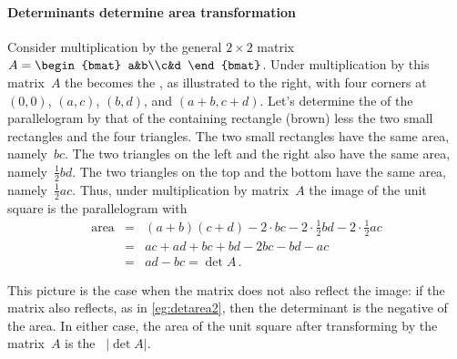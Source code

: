 \paragraph{Determinants determine area transformation}
Consider multiplication by the general \(2\times2\) matrix \(A=\begin{bmat} a&b\\c&d \end{bmat}\).
Under multiplication by this matrix~\(A\) the  becomes the , as illustrated to the right, with four corners at \((0,0)\), \((a,c)\), \((b,d)\), and \((a+b,c+d)\).
Let's determine the  of the parallelogram by that of the containing rectangle (brown) less the two small rectangles and the four triangles.
The two small rectangles have the same area, namely~\(bc\).
The two triangles on the left and the right also have the same area, namely~\(\frac12bd\).
The two triangles on the top and the bottom have the same area, namely~\(\frac12ac\).
Thus, under multiplication by matrix~\(A\) the image of the unit square is the parallelogram with 
\begin{eqnarray*}
\text{area}&=&(a+b)(c+d)-2\cdot bc-2\cdot\frac12bd-2\cdot\frac12ac
\\&=&ac+ad+bc+bd-2bc-bd-ac
\\&=&ad-bc=\det A\,.
\end{eqnarray*}

This picture is the case when the matrix does not also reflect the image:  if the matrix also reflects, as in \cref{eg:detarea2}, then the determinant is the negative of the area.
In either case, the area of the unit square after transforming by the matrix~\(A\) is the ~\(|\det A|\).


